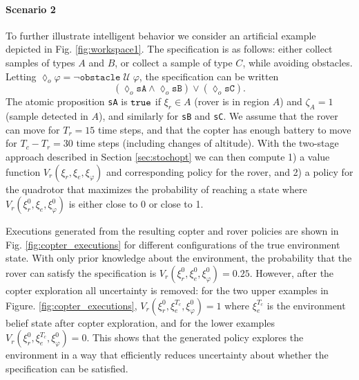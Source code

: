 \documentclass[conference]{IEEEtran}
\begin{document}
\paragraph{Scenario 2} To further illustrate intelligent behavior we consider an artificial example depicted in Fig. \ref{fig:workspace1}. The specification is as follows: either collect samples of types $A$ and $B$, or collect a sample of type $C$, while avoiding obstacles. Letting $\lozenge_o \varphi = \lnot \texttt{obstacle} \; \mathcal U \; \varphi$, the specification can be written
\begin{equation*}
  \left( \lozenge_o \texttt{sA} \land \lozenge_o \texttt{sB} \right)  \lor \left( \lozenge_o  \texttt{sC}  \right).
\end{equation*}
The atomic proposition \texttt{sA} is $\texttt{true}$ if $\xi_r \in A$ (rover is in region $A$) and $\zeta_A = 1$ (sample detected in $A$), and similarly for \texttt{sB} and \texttt{sC}. We assume that the rover can move for $T_r = 15$ time steps, and that the copter has enough battery to move for $T_c - T_r = 30$ time steps (including changes of altitude). With the two-stage approach described in Section \ref{sec:stochopt} we can then compute 1) a value function $V_r(\xi_r, \xi_e, \xi_\varphi)$ and corresponding policy for the rover, and 2) a policy for the quadrotor that maximizes the probability of reaching a state where $V_r(\xi_r^0, \xi_e, \xi_\varphi^0)$ is either close to 0 or close to 1.

Executions generated from the resulting copter and rover policies are shown in Fig. \ref{fig:copter_executions} for different configurations of the true environment state. With only prior knowledge about the environment, the probability that the rover can satisfy the specification is $V_r(\xi_r^0, \xi_e^0, \xi_\varphi^0) = 0.25$. However, after the copter exploration all uncertainty is removed: for the two upper examples in Figure. \ref{fig:copter_executions}, $V_r(\xi_r^0, \xi_e^{T_{c}}, \xi_\varphi^0) = 1$ where $\xi_e^{T_c}$ is the environment belief state after copter exploration, and for the lower examples $V_r(\xi_r^0, \xi_e^{T_{c}}, \xi_\varphi^0) = 0$. This shows that the generated policy explores the environment in a way that efficiently reduces uncertainty about whether the specification can be satisfied.
\end{document}
